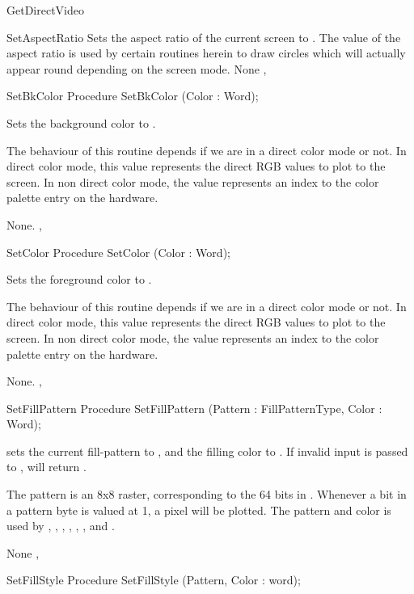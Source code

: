 \begin{function}{GetDirectVideo}
\begin{procedure}{SetAspectRatio}
\Description
Sets the aspect ratio of the
current screen to . The value of the aspect ratio is used
by certain routines herein to draw circles which will actually appear round
depending on the screen mode.
\Errors
None
\SeeAlso
{}, 
\end{procedure}
\begin{procedure}{SetBkColor}
\Declaration
Procedure SetBkColor (Color : Word);

\Description
Sets the background color to
.

The behaviour of this routine depends if we are in a direct color
mode or not. In direct color mode, this value represents the direct
RGB values to plot to the screen. In non direct color mode, the value
represents an index to the color palette entry on the hardware.

\Errors
None.
\SeeAlso
{}, 
\end{procedure}
\begin{procedure}{SetColor}
\Declaration
Procedure SetColor (Color : Word);

\Description
Sets the foreground color to
.

The behaviour of this routine depends if we are in a direct color
mode or not. In direct color mode, this value represents the direct
RGB values to plot to the screen. In non direct color mode, the value
represents an index to the color palette entry on the hardware.

\Errors
None.
\SeeAlso
{}, 
\end{procedure}
\begin{procedure}{SetFillPattern}
\Declaration
Procedure SetFillPattern (Pattern : FillPatternType, Color : Word);

\Description
{} sets the current fill-pattern to , and
the filling color to . If invalid input is passed to
,  will return .

The pattern is an 8x8 raster, corresponding to the 64 bits in
. Whenever a bit in a pattern byte is valued at 1,
a pixel will be plotted. The pattern and color is used by ,
, , , ,
, and .


\Errors
None
\SeeAlso
{}, 
\end{procedure}
\begin{procedure}{SetFillStyle}
\Declaration
Procedure SetFillStyle (Pattern, Color : word);


\end{procedure}
\end{function}
